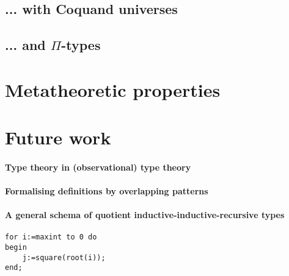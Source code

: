 \documentclass[a4paper,UKenglish,numberwithinsect,cleveref,thm-restate]{lipics-v2021}
\begin{document}
\subsection{... with Coquand universes} \label{subsec:SC+U}
\cite{Coquand2013}
\subsection{... and \texorpdfstring{$\Pi$}{Π}-types} \label{subsec:SC+U+Pi}

\section{Metatheoretic properties}

\section{Future work}

\paragraph*{Type theory in (observational) type theory}

\paragraph*{Formalising definitions by overlapping patterns}

\paragraph*{A general schema of quotient inductive-inductive-recursive types}


\appendix

\begin{conjecture}\label{testenv-conjecture}
\end{conjecture}

\begin{claim}\label{testenv-claim}
\end{claim}

\begin{claim*}\label{testenv-claim2}
\end{claim*}

\begin{claimproof}
\end{claimproof}
\begin{lstlisting}[caption={Formal definition in \Agda},label=list:8-6,captionpos=t,float,abovecaptionskip=-\medskipamount]
for i:=maxint to 0 do 
begin 
    j:=square(root(i));
end;
\end{lstlisting}
\end{document}
